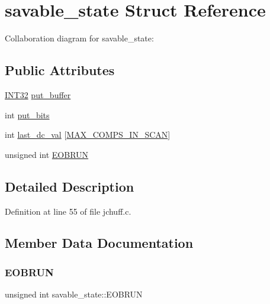 \hypertarget{structsavable__state}{}\section{savable\+\_\+state Struct Reference}
\label{structsavable__state}


Collaboration diagram for savable\+\_\+state\+:
\subsection*{Public Attributes}
\begin{DoxyCompactItemize}
\item 
\mbox{\hyperlink{jmorecfg_8h_a0cb58e7e6f0bad369840a52e54a56ae0}{I\+N\+T32}} \mbox{\hyperlink{structsavable__state_a71fdab6bc3ab791e85f61179045da4dd}{put\+\_\+buffer}}
\item 
int \mbox{\hyperlink{structsavable__state_a767d7a21d1bd5bee01108b947bfc9fbf}{put\+\_\+bits}}
\item 
int \mbox{\hyperlink{structsavable__state_a828b78727611f4ff5353d24cf7230d85}{last\+\_\+dc\+\_\+val}} \mbox{[}\mbox{\hyperlink{jpeglib_8h_adc7013da016c19051dc623fb3d8b35b4}{M\+A\+X\+\_\+\+C\+O\+M\+P\+S\+\_\+\+I\+N\+\_\+\+S\+C\+AN}}\mbox{]}
\item 
unsigned int \mbox{\hyperlink{structsavable__state_a23c64b6c9ba0c84041e1a0533c2312cb}{E\+O\+B\+R\+UN}}
\end{DoxyCompactItemize}


\subsection{Detailed Description}


Definition at line 55 of file jchuff.\+c.



\subsection{Member Data Documentation}
\mbox{\label{structsavable__state_a23c64b6c9ba0c84041e1a0533c2312cb}} 
\subsubsection{\texorpdfstring{EOBRUN}{EOBRUN}}
{\footnotesize\ttfamily unsigned int savable\+\_\+state\+::\+E\+O\+B\+R\+UN}



